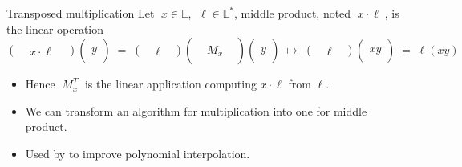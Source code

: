 \documentclass[10pt]{beamer}
\newcommand{\LK}{\mathbb{L}}
\begin{document}
\begin{frame}
  \begin{block}{Transposed multiplication}
    Let $\;x\in\LK$, $\;\ell\in\LK^\ast$, middle product, noted
    $\;x\cdot\ell\;$, is the linear operation
    \begin{equation*}
      \begin{pmatrix}&x\cdot\ell&\end{pmatrix}
      \begin{pmatrix}\\y\\{}\end{pmatrix} \;=\;
      \begin{pmatrix}&\ell&\end{pmatrix}
      \begin{pmatrix}\\&M_x&\\&\end{pmatrix} 
      \begin{pmatrix}\\y\\{}\end{pmatrix} \;\mapsto\;
      \begin{pmatrix}&\ell&\end{pmatrix}
      \begin{pmatrix}\\xy\\{}\end{pmatrix} \;=\;
      \ell(xy)
    \end{equation*}
    \vspace{-2mm}
    \begin{itemize}
    \item Hence $\;M_x^T\;$ is the linear application computing
      $x\cdot\ell$ from $\ell$.
    \item We can transform an algorithm for multiplication into one
      for middle product.
    \item Used by \cite{BLS03} to improve polynomial interpolation.
    \end{itemize}
  \end{block}
\end{frame}
\end{document}
